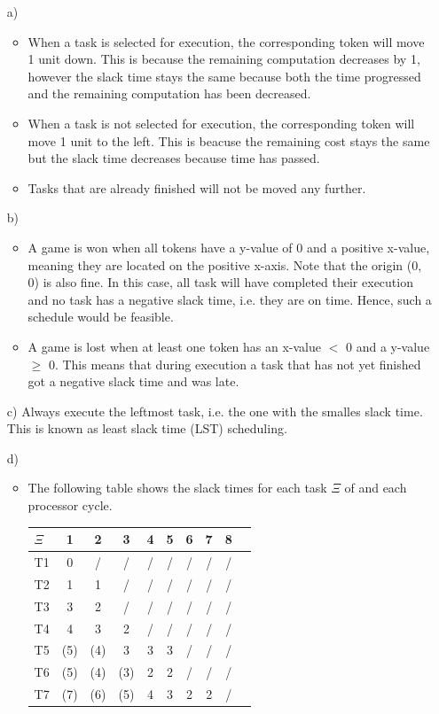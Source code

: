 \documentclass[12pt]{article}
\begin{document}
\begin{itemize}
\item[a)] 
	\begin{itemize}
	\item When a task is selected for execution, the corresponding token will move 1 unit down. This is because the remaining computation decreases by 1, however the slack time stays the same because both the time progressed and the remaining computation has been decreased. 
	\item When a task is not selected for execution, the corresponding token will move 1 unit to the left. This is beacuse the remaining cost stays the same but the slack time decreases because time has passed.
	\item Tasks that are already finished will not be moved any further.
	\end{itemize}
	
\item[b)] 
	\begin{itemize}
	\item A game is won when all tokens have a y-value of 0 and a positive x-value, meaning they are located on the positive x-axis. Note that the origin (0, 0) is also fine. In this case, all task will have completed their execution and no task has a negative slack time, i.e. they are on time. Hence, such a schedule would be feasible.
	\item A game is lost when at least one token has an x-value $<$ 0 and a y-value $\geq$ 0. This means that during execution a task that has not yet finished got a negative slack time and was late. 
	\end{itemize}
	
\item[c)] Always execute the leftmost task, i.e. the one with the smalles slack time.  This is known as least slack time (LST) scheduling.

\item[d)] \begin{itemize}
	\item The following table shows the slack times for each task $\Xi$ of  and each processor cycle.
	
	\begin{tabular}{ l | c | c | c | c | c | c | c | c | c}
  		\hline			
  		$\Xi$ & 1 & 2 & 3 & 4 & 5 & 6 & 7 & 8 \\
  		\hline
  		T1 & 0 	& / 	& / 	& / 	& / 	& / & / & / \\
  		T2 & 1 	& 1 	& / 	& / 	& / 	& / & / & / \\
  		T3 & 3 	& 2 	& / 	& / 	& / 	& / & / & / \\
  		T4 & 4 	& 3 	& 2 	& / 	& / 	& / & / & / \\
  		T5 & (5) 	& (4) 	& 3 	& 3 	& 3 	& / & / & / \\
  		T6 & (5) 	& (4) 	& (3) 	& 2 	& 2 	& / & / & / \\
  		T7 & (7) 	& (6) 	& (5) 	& 4 	& 3 	& 2 & 2 & / \\
  		\hline  
	\end{tabular}
	

\end{itemize}
\end{itemize}
\end{document}

